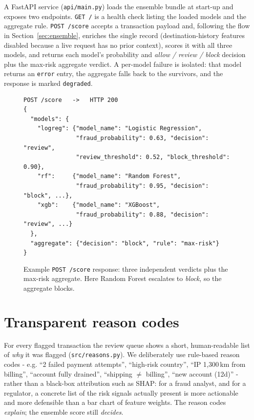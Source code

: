 \documentclass[11pt,a4paper]{report}
\newcommand{\code}[1]{\texttt{\small #1}}
\begin{document}
A FastAPI service (\code{api/main.py}) loads the ensemble bundle at start-up and exposes two
endpoints. \code{GET /} is a health check listing the loaded models and the aggregate rule.
\code{POST /score} accepts a transaction payload and, following the flow in
Section~\ref{sec:ensemble}, enriches the single record (destination-history features disabled
because a live request has no prior context), scores it with all three models, and returns
each model's probability and \emph{allow / review / block} decision plus the max-risk
aggregate verdict. A per-model failure is isolated: that model returns an \code{error} entry,
the aggregate falls back to the survivors, and the response is marked \code{degraded}.

\begin{figure}[h]
\centering
\begin{minipage}{0.95\textwidth}
{\footnotesize
\begin{verbatim}
POST /score   ->   HTTP 200
{
  "models": {
    "logreg": {"model_name": "Logistic Regression",
               "fraud_probability": 0.63, "decision": "review",
               "review_threshold": 0.52, "block_threshold": 0.90},
    "rf":     {"model_name": "Random Forest",
               "fraud_probability": 0.95, "decision": "block", ...},
    "xgb":    {"model_name": "XGBoost",
               "fraud_probability": 0.88, "decision": "review", ...}
  },
  "aggregate": {"decision": "block", "rule": "max-risk"}
}
\end{verbatim}
}
\end{minipage}
\caption{Example \code{POST /score} response: three independent verdicts plus the max-risk
aggregate. Here Random Forest escalates to \emph{block}, so the aggregate blocks.}
\label{fig:apiresp}
\end{figure}

\section{Transparent reason codes}

For every flagged transaction the review queue shows a short, human-readable list of
\emph{why} it was flagged (\code{src/reasons.py}). We deliberately use rule-based reason
codes - e.g. ``2 failed payment attempts'', ``high-risk country'', ``IP 1{,}300\,km from
billing'', ``account fully drained'', ``shipping $\ne$ billing'', ``new account (12d)'' -
rather than a black-box attribution such as SHAP: for a fraud analyst, and for a regulator,
a concrete list of the risk signals actually present is more actionable and more defensible
than a bar chart of feature weights. The reason codes \emph{explain}; the ensemble score
still \emph{decides}.
\end{document}
